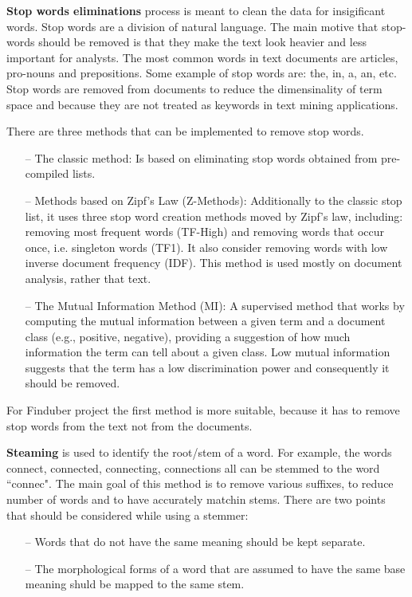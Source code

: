 \textbf{Stop words eliminations} process is meant to clean the data for insigificant words. Stop words are a division of natural language. The main motive that stop-words should be removed is that they make the text look heavier and less important for analysts. The most common words in text documents are articles, pro-nouns and prepositions. Some example of stop words are: the, in, a, an, etc. Stop words are removed from documents to reduce the dimensinality of term space and because they are not treated as keywords in text mining applications. \cite{sufix}

There are three methods that can be implemented to remove stop words. 
\begin{itemize}

\item[--]{The classic method:} Is based on eliminating stop words obtained from pre-compiled lists.

\item[--]{Methods based on Zipf's Law (Z-Methods):} Additionally to the classic stop list, it uses three stop word creation methods moved by Zipf's law, including: removing most frequent words (TF-High) and removing words that occur once, i.e. singleton words (TF1). It also consider removing words with low inverse document frequency (IDF). This method is used mostly on document analysis, rather that text.

\item[--]{The Mutual Information Method (MI):} A supervised method that works by computing the mutual information between a given term and a document class (e.g., positive, negative), providing a suggestion of how much information the term can tell about a given class. Low mutual information suggests that the term has a low discrimination power and consequently it should be removed.\cite{MI}

\end{itemize}
For Finduber project the first method is more suitable, because it has to remove stop words from the text not from the documents.

\textbf{Steaming} is used to identify the root/stem of a word. For example, the words connect, connected, connecting, connections all can be stemmed to the word ``connec". \cite{stemming} The main goal of this method is to remove various suffixes, to reduce number of words and to have accurately matchin stems. There are two points that should be considered while using a stemmer:

\begin{itemize}
\item[--] Words that do not have the same meaning should be kept separate.
\item[--] The morphological forms of a word that are assumed to have the same base meaning shuld be mapped to the same stem. 
\end{itemize}

